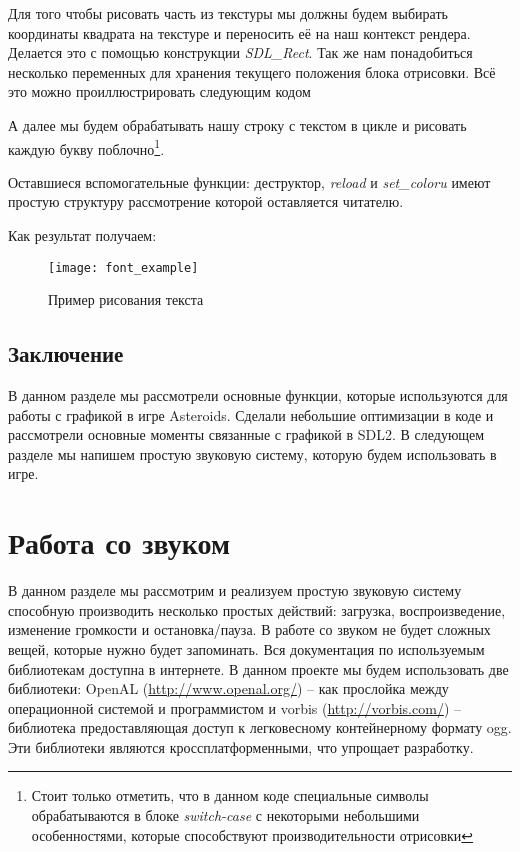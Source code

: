 Для того чтобы рисовать часть из текстуры мы должны будем выбирать координаты квадрата на текстуре и 
переносить её на наш контекст рендера. Делается это с помощью конструкции \emph{SDL\_Rect}. Так же нам 
понадобиться несколько переменных для хранения текущего положения блока отрисовки. Всё это можно 
проиллюстрировать следующим кодом


А далее мы будем обрабатывать нашу строку с текстом в цикле и рисовать каждую букву поблочно\footnote{Стоит 
только отметить, что в данном коде специальные символы обрабатываются в блоке \emph{switch-case} с 
некоторыми небольшими особенностями, которые способствуют производительности отрисовки}.


Оставшиеся вспомогательные функции: деструктор, \emph{reload} и 
\emph{set\_coloru} имеют простую структуру рассмотрение которой оставляется читателю.

Как результат получаем:
\begin{figure}[ht!]
    \centering
    \texttt{[image: font\_example]}
    \caption{Пример рисования текста}
    \label{img:fontExample}
\end{figure}

\section{Заключение}
В данном разделе мы рассмотрели основные функции, которые используются для работы с графикой в игре 
Asteroids. Сделали небольшие оптимизации в коде и рассмотрели основные моменты связанные с графикой в SDL2. 
В следующем разделе мы напишем простую звуковую систему, которую будем использовать в игре. 

\chapter{Работа со звуком}
В данном разделе мы рассмотрим и реализуем простую звуковую систему способную производить несколько простых 
действий: загрузка, воспроизведение, изменение громкости и остановка/пауза. В работе со звуком не будет 
сложных вещей, которые нужно будет запоминать. Вся документация по используемым библиотекам доступна в 
интернете. В данном проекте мы будем использовать две библиотеки: OpenAL (\url{http://www.openal.org/}) -- 
как прослойка между операционной системой и программистом и vorbis (\url{http://vorbis.com/}) -- библиотека 
предоставляющая доступ к легковесному контейнерному формату ogg. Эти библиотеки являются кроссплатформенными, 
что упрощает разработку. 

